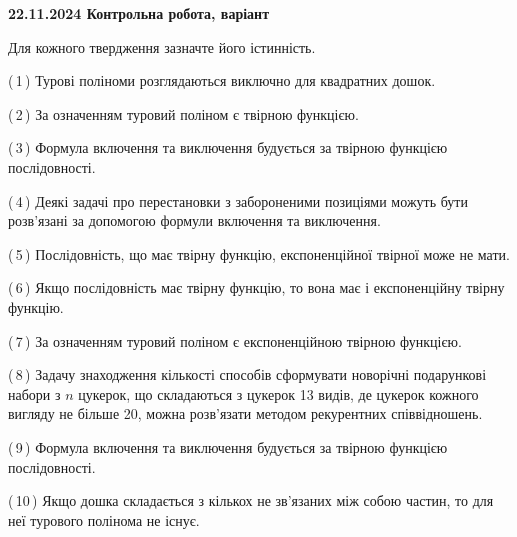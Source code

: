 \documentclass[12pt, ukrainian]{article}
\begin{document}
\begin {large}
\begin {large}
\begin {large}
\begin {large}
\begin {large}
\begin {large}
\begin {large}
\begin {large}
\begin {large}
\begin {large}
\begin {large}
\begin {large}
\begin {large}
\begin {large}
\begin {large}
\begin {large}
\begin {large}
\begin {large}
\begin {large}
\begin {large}
\begin {large}
{\vspace{5mm}
}
\newpage

\begin {large}

\textbf{22.11.2024 Контрольна робота, варіант  }\par


{
Для кожного твердження зазначте його істинність.\par

\vspace{2mm}

(\,1\,) Турові поліноми розглядаються виключно для квадратних дошок.%



(\,2\,) За означенням туровий поліном є твірною функцією.%



(\,3\,) Формула включення та виключення будується за твірною функцією послідовності.%



(\,4\,) Деякі задачі про перестановки з забороненими позиціями можуть бути розв’я\-за\-ні за допомогою формули включення та виключення.%



(\,5\,) Послідовність, що має твірну функцію, експоненційної твірної може не мати.%



(\,6\,) Якщо послідовність має твірну функцію, то вона має і експоненційну твірну функцію.%



(\,7\,) За означенням туровий поліном є експоненційною твірною функцією.%



(\,8\,) Задачу знаходження кількості способів сформувати новорічні подарункові набори з $n$ цукерок, що складаються з цукерок 13 видів, де цукерок кожного вигляду не більше 20, можна розв’язати методом рекурентних співвідношень.%



(\,9\,) Формула включення та виключення будується за твірною функцією послідовності.%



(\,10\,) Якщо дошка складається з кількох не зв’язаних між собою частин, то для неї турового полінома не існує.%




\vspace{5mm}
}
\newpage

\begin {large}


\end{large}
\end{large}
\end{large}
\end{large}
\end{large}
\end{large}
\end{large}
\end{large}
\end{large}
\end{large}
\end{large}
\end{large}
\end{large}
\end{large}
\end{large}
\end{large}
\end{large}
\end{large}
\end{large}
\end{large}
\end{large}
\end{large}
\end{large}
\end{document}
